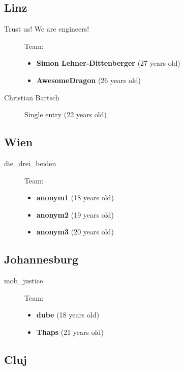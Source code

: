 \documentclass[a4paper,11pt]{article}
\begin{document}
\subsection{Linz}

\begin{description}
  \item[Trust us! We are engineers!]
    Team:
    \begin{itemize}
      \item \textbf{Simon Lehner-Dittenberger} (27 years old)
      \item \textbf{AwesomeDragon} (26 years old)
    \end{itemize}
  \item[Christian Bartsch]
    Single entry (22 years old)
\end{description}

\subsection{Wien}

\begin{description}
  \item[die\_drei\_beiden]
    Team:
    \begin{itemize}
      \item \textbf{anonym1} (18 years old)
      \item \textbf{anonym2} (19 years old)
      \item \textbf{anonym3} (20 years old)
    \end{itemize}
\end{description}

\subsection{Johannesburg}

\begin{description}
  \item[mob\_justice]
    Team:
    \begin{itemize}
      \item \textbf{dube} (18 years old)
      \item \textbf{Thaps} (21 years old)
    \end{itemize}
\end{description}

\subsection{Cluj}
\end{document}
